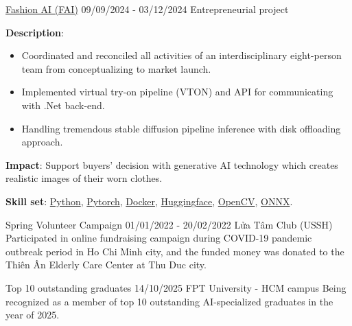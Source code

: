 \documentclass{src/preamble/doc_class}
\begin{document}
	\begin{SecondaryMainBar}{\ColorBackground}{\ColorTextSide}
	\end{SecondaryMainBar}
	
	\begin{SecondaryMainPart}
		\Experience
		{\ColorHighlight}
		{\href{https://fashion-ai-innovation.vercel.app/}{Fashion AI (FAI)}}
		{09/09/2024 - 03/12/2024}
		{Entrepreneurial project}
		{
			\textbf{Description}:
			\begin{itemize}[label=$\bullet$,topsep=-.5ex,itemsep=-0.5ex]
				\item Coordinated and reconciled all activities of an interdisciplinary eight-person team from conceptualizing to market launch.
				
				\item Implemented virtual try-on pipeline (VTON) and API for communicating with .Net back-end.
				
				\item Handling tremendous stable diffusion pipeline inference with disk offloading approach.
			\end{itemize}
			\vspace{0.15cm}
			
			\textbf{Impact}: Support buyers' decision with generative AI technology which creates realistic images of their worn clothes.
			\vspace{.15cm}
			
			\textbf{Skill set}: \href{https://www.python.org/}{Python}, \href{https://pytorch.org/}{Pytorch}, \href{https://www.docker.com/}{Docker}, \href{https://huggingface.co/}{Huggingface}, \href{https://opencv.org/}{OpenCV}, \href{https://onnx.ai/}{ONNX}.
		}
				\vspace{.35cm}
		
		\Experience
		{\ColorHighlight}
		{Spring Volunteer Campaign}
		{01/01/2022 - 20/02/2022}
		{Lửa Tâm Club (USSH)}
		{
			Participated in online fundraising campaign during COVID-19 pandemic outbreak period in Ho Chi Minh city, and the funded money was donated to the Thiên Ân Elderly Care Center at Thu Duc city.
		}
		
		\Experience
		{\ColorHighlight}
		{Top 10 outstanding graduates}
		{14/10/2025}
		{FPT University - HCM campus}
		{
			Being recognized as a member of top 10 outstanding AI-specialized graduates in the year of 2025.
		}
	\end{SecondaryMainPart}
\end{document}
